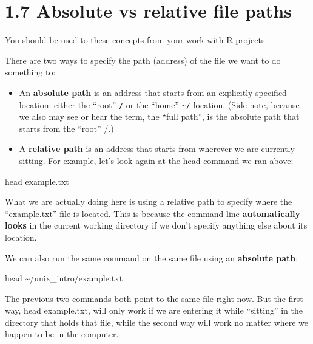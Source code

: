 \documentclass[
]{book}
\newenvironment{Shaded}{\begin{snugshade}}{\end{snugshade}}
\newcommand{\FunctionTok}[1]{\textcolor[rgb]{0.00,0.00,0.00}{#1}}
\newcommand{\NormalTok}[1]{#1}
\begin{document}
\hypertarget{absolute-vs-relative-file-paths}{%
\section{1.7 Absolute vs relative file paths}\label{absolute-vs-relative-file-paths}}

You should be used to these concepts from your work with R projects.

There are two ways to specify the path (address) of the file we want to do something to:

\begin{itemize}
\item
  An \textbf{absolute path} is an address that starts from an explicitly specified location: either the ``root'' \texttt{/} or the ``home'' \texttt{\textasciitilde{}/} location. (Side note, because we also may see or hear the term, the ``full path'', is the absolute path that starts from the ``root'' /.)
\item
  A \textbf{relative path} is an address that starts from wherever we are currently sitting. For example, let's look again at the head command we ran above:
\end{itemize}

\begin{Shaded}
\begin{Highlighting}[]
    \FunctionTok{head}\NormalTok{ example.txt}
\end{Highlighting}
\end{Shaded}

What we are actually doing here is using a relative path to specify where the ``example.txt'' file is located. This is because the command line \textbf{automatically looks} in the current working directory if we don't specify anything else about its location.

We can also run the same command on the same file using an \textbf{absolute path}:

\begin{Shaded}
\begin{Highlighting}[]
    \FunctionTok{head}\NormalTok{ \textasciitilde{}/unix\_intro/example.txt}
\end{Highlighting}
\end{Shaded}

The previous two commands both point to the same file right now. But the first way, head example.txt, will only work if we are entering it while ``sitting'' in the directory that holds that file, while the second way will work no matter where we happen to be in the computer.
\end{document}
